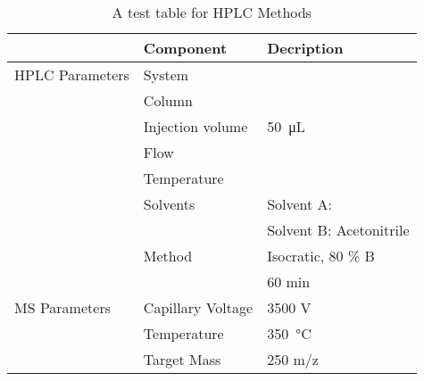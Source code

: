 \begin{table}[h]
	\caption{A test table for HPLC Methods}
	\label{tab:asddf}
	\centering
	\begin{tabularx}{\textwidth}{XXX}
						& \textbf{Component}		& \textbf{Decription}	\\
		\midrule
		HPLC Parameters & System			& 	\\
						& Column			& 	\\
						& Injection volume 	& \SI{50}{\micro\liter}	\\
						& Flow				& 	\\
						& Temperature		& 	\\
						& Solvents			& Solvent A: \ch{H2O}	\\
						& 					& Solvent B: Acetonitrile	\\
						& Method			& Isocratic, 80 \% B \\
						&					& 60 min \\
		MS Parameters	& Capillary Voltage	& 3500 V\\
						& Temperature		& \SI{350}{\celsius}	\\
						& Target Mass		& 250 m/z \\
		\bottomrule
	\end{tabularx}
\end{table}

